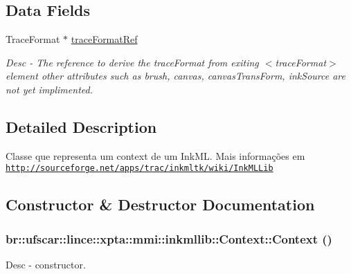 \subsection*{Data Fields}
\begin{DoxyCompactItemize}
\item 
TraceFormat $\ast$ \hyperlink{classbr_1_1ufscar_1_1lince_1_1xpta_1_1mmi_1_1inkmllib_1_1Context_a8dccf5d66bcb8872945e80eab527f6e1}{traceFormatRef}
\begin{DoxyCompactList}\small\item\em Desc -\/ The reference to derive the traceFormat from exiting $<$traceFormat$>$ element other attributes such as brush, canvas, canvasTransForm, inkSource are not yet implimented. \item\end{DoxyCompactList}\end{DoxyCompactItemize}


\subsection{Detailed Description}
Classe que representa um context de um InkML. Mais informações em \href{http://sourceforge.net/apps/trac/inkmltk/wiki/InkMLLib}{\tt http://sourceforge.net/apps/trac/inkmltk/wiki/InkMLLib} 

\subsection{Constructor \& Destructor Documentation}
\hypertarget{classbr_1_1ufscar_1_1lince_1_1xpta_1_1mmi_1_1inkmllib_1_1Context_a1f3a86710a6cfc23792b3963c88b94a6}{
\subsubsection[{Context}]{\setlength{\rightskip}{0pt plus 5cm}br::ufscar::lince::xpta::mmi::inkmllib::Context::Context ()}}
\label{classbr_1_1ufscar_1_1lince_1_1xpta_1_1mmi_1_1inkmllib_1_1Context_a1f3a86710a6cfc23792b3963c88b94a6}


Desc -\/ constructor. 




